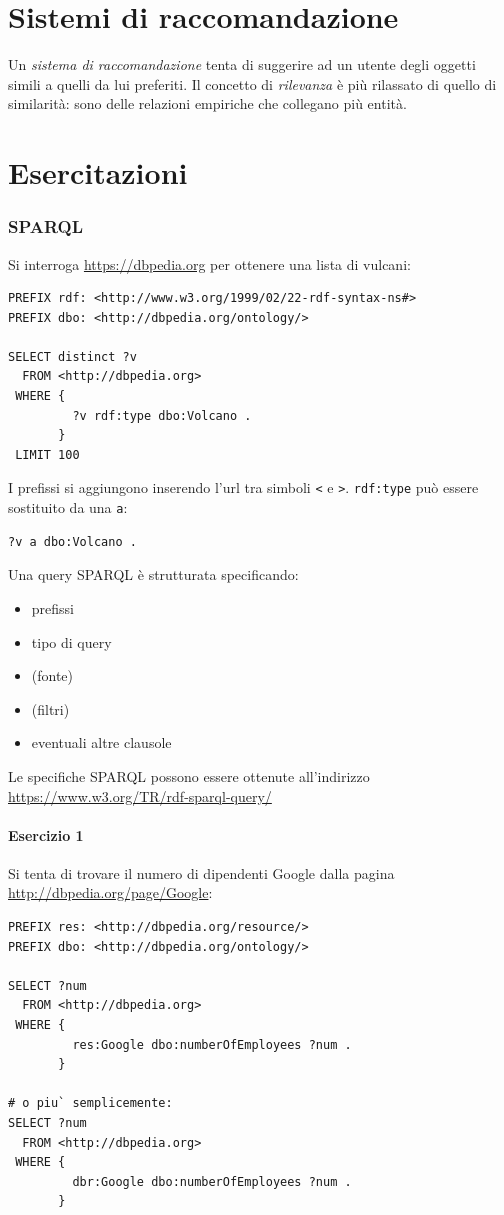 \documentclass[11pt]{article}
\begin{document}
\newpage
\part{Sistemi di raccomandazione}
Un \textit{sistema di raccomandazione} tenta di suggerire ad un utente degli oggetti simili a quelli da lui preferiti.
Il concetto di \textit{rilevanza} è più rilassato di quello di similarità: sono delle relazioni empiriche che collegano più entità.

\newpage
\part{Esercitazioni}

\section{SPARQL}
Si interroga \url{https://dbpedia.org} per ottenere una lista di vulcani:
\begin{lstlisting}[language=sparql]
PREFIX rdf: <http://www.w3.org/1999/02/22-rdf-syntax-ns#>
PREFIX dbo: <http://dbpedia.org/ontology/>

SELECT distinct ?v
  FROM <http://dbpedia.org>
 WHERE {
         ?v rdf:type dbo:Volcano .
       }
 LIMIT 100
\end{lstlisting}
I prefissi si aggiungono inserendo l'url tra simboli \verb|<| e \verb|>|.
\verb|rdf:type| può essere sostituito da una \verb|a|:
\begin{lstlisting}[language=sparql]
?v a dbo:Volcano .
\end{lstlisting}

Una query SPARQL è strutturata specificando:
\begin{itemize}
  \item prefissi
  \item tipo di query
  \item (fonte)
  \item (filtri)
  \item eventuali altre clausole
\end{itemize}
Le specifiche SPARQL possono essere ottenute all'indirizzo \url{https://www.w3.org/TR/rdf-sparql-query/}

\subsection*{Esercizio 1}
Si tenta di trovare il numero di dipendenti Google dalla pagina \url{http://dbpedia.org/page/Google}:
\begin{lstlisting}[language=sparql]
PREFIX res: <http://dbpedia.org/resource/>
PREFIX dbo: <http://dbpedia.org/ontology/>

SELECT ?num
  FROM <http://dbpedia.org>
 WHERE {
         res:Google dbo:numberOfEmployees ?num .
       }

# o piu` semplicemente:
SELECT ?num
  FROM <http://dbpedia.org>
 WHERE {
         dbr:Google dbo:numberOfEmployees ?num .
       }
\end{lstlisting}
\end{document}
